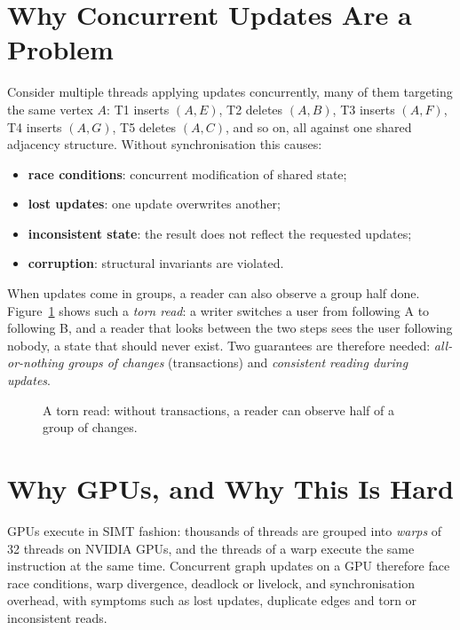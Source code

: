 \documentclass[11pt,a4paper,oneside]{report}
\begin{document}
\section{Why Concurrent Updates Are a Problem}
Consider multiple threads applying updates concurrently, many of them targeting the same vertex $A$: T1 inserts $(A,E)$,
T2 deletes $(A,B)$, T3 inserts $(A,F)$, T4 inserts $(A,G)$, T5 deletes $(A,C)$, and so on, all against one shared
adjacency structure. Without synchronisation this causes:
\begin{itemize}
\item \textbf{race conditions}: concurrent modification of shared state;
\item \textbf{lost updates}: one update overwrites another;
\item \textbf{inconsistent state}: the result does not reflect the requested updates;
\item \textbf{corruption}: structural invariants are violated.
\end{itemize}

When updates come in groups, a reader can also observe a group half done. Figure~\ref{fig:torn} shows such a
\emph{torn read}: a writer switches a user from following A to following B, and a reader that looks between the two
steps sees the user following nobody, a state that should never exist. Two guarantees are therefore needed:
\emph{all-or-nothing groups of changes} (transactions) and \emph{consistent reading during updates}.

\begin{figure}[H]
\centering
{}
\caption{A torn read: without transactions, a reader can observe half of a group of changes.}
\label{fig:torn}
\end{figure}

\section{Why GPUs, and Why This Is Hard}
GPUs execute in SIMT fashion: thousands of threads are grouped into \emph{warps} of 32 threads on NVIDIA GPUs, and the
threads of a warp execute the same instruction at the same time. Concurrent graph updates on a GPU therefore face race
conditions, warp divergence, deadlock or livelock, and synchronisation overhead, with symptoms such as lost updates,
duplicate edges and torn or inconsistent reads.
\end{document}
